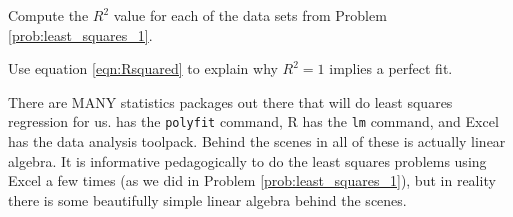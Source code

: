 \begin{problem}
    Compute the $R^2$ value for each of the data sets from Problem
    \ref{prob:least_squares_1}.
\end{problem}

\begin{problem}
    Use equation \eqref{eqn:Rsquared} to explain why $R^2=1$ implies a perfect fit.
\end{problem}

There are MANY statistics packages out there that will do least squares regression for us.
\ProgLang has the \texttt{polyfit} command, R has the \texttt{lm} command, and Excel has the
data analysis toolpack.  Behind the scenes in all of these is actually linear algebra.  It
is informative pedagogically to do the least squares problems using Excel a few times (as
we did in Problem \ref{prob:least_squares_1}), but in reality there is some beautifully
simple linear algebra behind the scenes.

